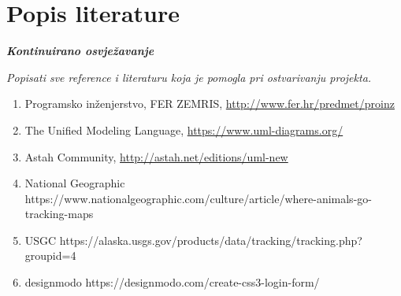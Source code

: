 \chapter*{Popis literature}
	 	
 		\textbf{\textit{Kontinuirano osvježavanje}}
	
		\textit{Popisati sve reference i literaturu koja je pomogla pri ostvarivanju projekta.}
		
		
		\begin{enumerate}
			
			
			\item  Programsko inženjerstvo, FER ZEMRIS, \url{http://www.fer.hr/predmet/proinz}
			
			
			\item  The Unified Modeling Language, \url{https://www.uml-diagrams.org/}
			
			\item  Astah Community, \url{http://astah.net/editions/uml-new}
			
			\item National Geographic https://www.nationalgeographic.com/culture/article/where-animals-go-tracking-maps
			
			\item USGC https://alaska.usgs.gov/products/data/tracking/tracking.php?groupid=4
			
			\item designmodo https://designmodo.com/create-css3-login-form/
		\end{enumerate}
		
		 